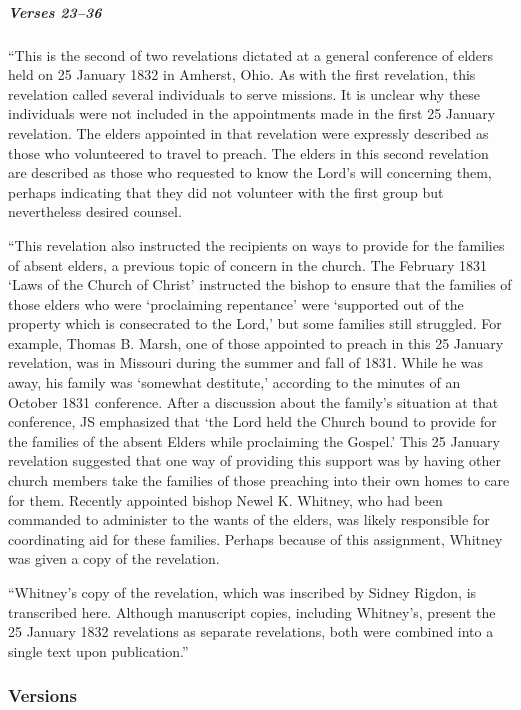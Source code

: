 			\subparagraph{Verses 23--36}
			
				``This is the second of two revelations dictated at a general conference of elders held on 25 January 1832 in Amherst, Ohio. As with the first revelation, this revelation called several individuals to serve missions. It is unclear why these individuals were not included in the appointments made in the first 25 January revelation. The elders appointed in that revelation were expressly described as those who volunteered to travel to preach. The elders in this second revelation are described as those who requested to know the Lord's will concerning them, perhaps indicating that they did not volunteer with the first group but nevertheless desired counsel.
				
				``This revelation also instructed the recipients on ways to provide for the families of absent elders, a previous topic of concern in the church. The February 1831 `Laws of the Church of Christ' instructed the bishop to ensure that the families of those elders who were `proclaiming repentance' were `supported out of the property which is consecrated to the Lord,' but some families still struggled. For example, Thomas B. Marsh, one of those appointed to preach in this 25 January revelation, was in Missouri during the summer and fall of 1831. While he was away, his family was `somewhat destitute,' according to the minutes of an October 1831 conference. After a discussion about the family's situation at that conference, JS emphasized that `the Lord held the Church bound to provide for the families of the absent Elders while proclaiming the Gospel.' This 25 January revelation suggested that one way of providing this support was by having other church members take the families of those preaching into their own homes to care for them. Recently appointed bishop Newel K. Whitney, who had been commanded to administer to the wants of the elders, was likely responsible for coordinating aid for these families. Perhaps because of this assignment, Whitney was given a copy of the revelation.
				
				``Whitney's copy of the revelation, which was inscribed by Sidney Rigdon, is transcribed here. Although manuscript copies, including Whitney's, present the 25 January 1832 revelations as separate revelations, both were combined into a single text upon publication.''
		
	\subsubsection{Versions}
		\label{DC75-V}
		
